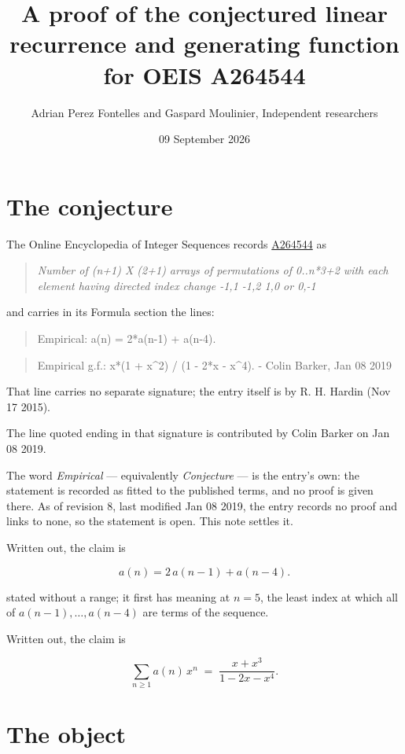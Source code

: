 \documentclass[11pt]{article}
\title{A proof of the conjectured linear recurrence and generating function for OEIS A264544}
\author{Adrian Perez Fontelles and Gaspard Moulinier, Independent researchers}
\date{09 September 2026}
\theoremstyle{definition}
\begin{document}
\maketitle
\section{The conjecture}

The Online Encyclopedia of Integer Sequences records \href{https://oeis.org/A264544}{A264544} as

\begin{quote}\itshape Number of (n+1) X (2+1) arrays of permutations of 0..n*3+2 with each element having directed index change -1,1 -1,2 1,0 or 0,-1\end{quote}

and carries in its Formula section the lines:

\begin{quote}\ttfamily Empirical: a(n) = 2*a(n-1) + a(n-4).\end{quote}

\begin{quote}\ttfamily Empirical g.f.: x*(1 + x\textasciicircum{}2) / (1 - 2*x - x\textasciicircum{}4). - Colin Barker, Jan 08 2019\end{quote}

That line carries no separate signature; the entry itself is by R. H. Hardin (Nov 17 2015).

The line quoted ending in that signature is contributed by Colin Barker on Jan 08 2019.

The word {\itshape Empirical} --- equivalently {\itshape Conjecture} --- is the entry's own: the statement is recorded as fitted to the published terms, and no proof is given there. As of revision 8, last modified Jan 08 2019, the entry records no proof and links to none, so the statement is open. This note settles it.

Written out, the claim is

\[a(n) = 2\,a(n-1) + a(n-4).\]

stated without a range; it first has meaning at $n = 5$, the least index at which all of $a(n-1),\dots,a(n-4)$ are terms of the sequence.

Written out, the claim is

\[\sum_{n \ge 1} a(n)\,x^n \;=\; \frac{x + x^{3}}{1 - 2x - x^{4}}.\]

\section{The object}
\end{document}
